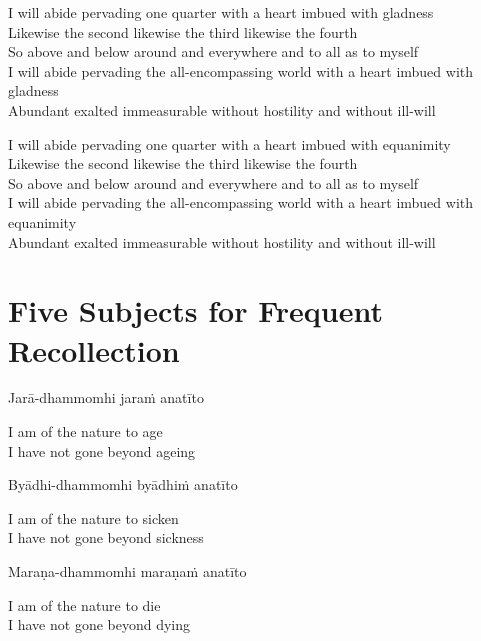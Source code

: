 I will abide pervading one quarter with a heart imbued with gladness\\
Likewise the second likewise the third likewise the fourth\\
So above and below around and everywhere and to all as to myself\\
I will abide pervading the all-encompassing world with a heart imbued with gladness\\
Abundant exalted immeasurable without hostility and without ill-will

I will abide pervading one quarter with a heart imbued with equanimity\\
Likewise the second likewise the third likewise the fourth\\
So above and below around and everywhere and to all as to myself\\
I will abide pervading the all-encompassing world with a heart imbued with equanimity\\
Abundant exalted immeasurable without hostility and without ill-will

\suttaRef{[DN 13]}

\clearpage

\section{Five Subjects for Frequent Recollection}

\begin{leader}
\end{leader}

Jarā-dhammomhi jaraṁ anatīto

\begin{english}
  I am of the nature to age\\
  I have not gone beyond ageing
\end{english}

Byādhi-dhammomhi byādhiṁ anatīto

\begin{english}
  I am of the nature to sicken\\
  I have not gone beyond sickness
\end{english}

Maraṇa-dhammomhi maraṇaṁ anatīto

\begin{english}
  I am of the nature to die\\
  I have not gone beyond dying
\end{english}

